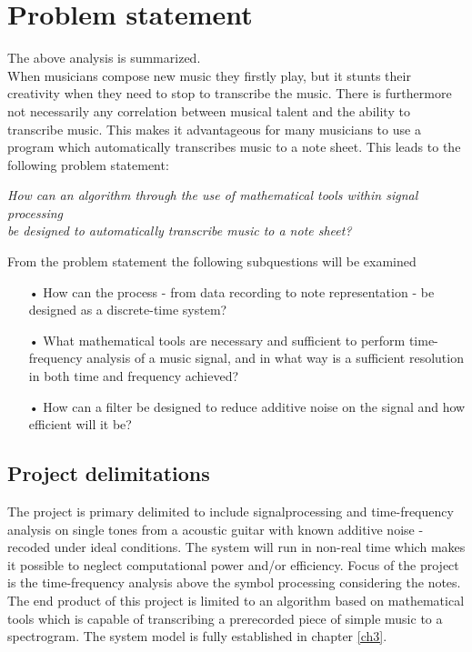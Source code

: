\section{Problem statement}
The above analysis is summarized.\\
When musicians compose new music they firstly play, but it stunts their creativity when they need to stop to transcribe the music. There is furthermore not necessarily any correlation between musical talent and the ability to transcribe music. This makes it advantageous for many musicians to use a program which automatically transcribes music to a note sheet. This leads to the following problem statement:

\begin{center}
\textit{How can an algorithm through the use of mathematical tools within signal processing  \\
be designed to automatically transcribe music to a note sheet?}
\end{center}

From the problem statement the following subquestions will be examined 
\begin{itemize}
\item[•] How can the process - from data recording to note representation - be designed as a discrete-time system?
\item[•] What mathematical tools are necessary and sufficient to perform time-frequency analysis of a music signal, and in what way is a sufficient resolution in both time and frequency achieved?   
\item[•] How can a filter be designed to reduce additive noise on the signal and how efficient will it be? 
\end{itemize}

\subsection{Project delimitations}
The project is primary delimited to include signalprocessing and time-frequency analysis on single tones from a acoustic guitar with known additive noise - recoded under ideal conditions. The system will run in non-real time which makes it possible to neglect computational power and/or efficiency. Focus of the project is the time-frequency analysis above the symbol processing considering the notes.\\
The end product of this project is limited to an algorithm based on mathematical tools which is capable of transcribing a prerecorded piece of simple music to a spectrogram. The system model is fully established in chapter \ref{ch3}.        


